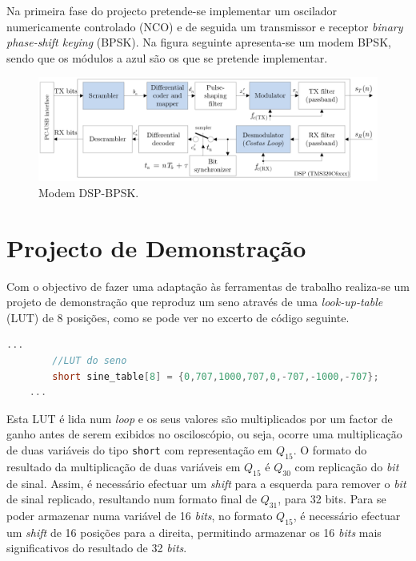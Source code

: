 \documentclass[11pt]{article}
\numberwithin{equation}{section}
\begin{document}
Na primeira fase do projecto pretende-se implementar um oscilador numericamente controlado (NCO) e de seguida um transmissor e receptor \textit{binary phase-shift keying} (BPSK). Na figura seguinte apresenta-se um modem BPSK, sendo que os módulos a azul são os que se pretende implementar.

\begin{figure}[H]
	\centering
	\includegraphics[keepaspectratio=true, scale=0.30]{teoricas/modem}
	\caption{Modem DSP-BPSK.}
	\vspace{-0.8em}
\end{figure}

\pagebreak

\section{Projecto de Demonstração}

Com o objectivo de fazer uma adaptação às ferramentas de trabalho realiza-se um projeto de demonstração que reproduz um seno através de uma \textit{look-up-table} (LUT) de 8 posições, como se pode ver no excerto de código seguinte.

\begin{lstlisting}[language=C]
	...
		//LUT do seno
		short sine_table[8] = {0,707,1000,707,0,-707,-1000,-707}; 
	...
\end{lstlisting}

Esta LUT é lida num \textit{loop} e os seus valores são multiplicados por um factor de ganho antes de serem exibidos no osciloscópio, ou seja, ocorre uma multiplicação de duas variáveis do tipo \texttt{short} com representação em $Q_{15}$. O formato do resultado da multiplicação de duas variáveis em $Q_{15}$ é $Q_{30}$ com replicação do \textit{bit} de sinal. Assim, é necessário efectuar um \textit{shift} para a esquerda para remover o \textit{bit} de sinal replicado, resultando num formato final de $Q_{31}$, para 32 bits. Para se poder armazenar numa variável de 16 \textit{bits}, no formato $Q_{15}$, é necessário efectuar um \textit{shift} de 16 posições para a direita, permitindo armazenar os 16 \textit{bits} mais significativos do resultado de 32 \textit{bits}. 
\end{document}
